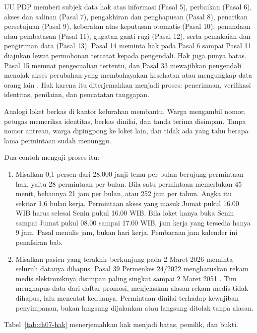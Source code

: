 UU PDP memberi subjek data hak atas informasi (Pasal 5), perbaikan (Pasal 6), akses dan salinan
(Pasal 7), pengakhiran dan penghapusan (Pasal 8), penarikan persetujuan (Pasal 9), keberatan atas
keputusan otomatis (Pasal 10), penundaan atau pembatasan (Pasal 11), gugatan ganti rugi (Pasal 12),
serta pemakaian dan pengiriman data (Pasal 13). Pasal 14 meminta hak pada Pasal 6 sampai Pasal 11
diajukan lewat permohonan tercatat kepada pengendali. Hak juga punya batas. Pasal 15 memuat
pengecualian tertentu, dan Pasal 33 mewajibkan pengendali menolak akses perubahan yang membahayakan
kesehatan atau mengungkap data orang lain \cite{uu27-2022-pdp}. Hak karena itu diterjemahkan menjadi
proses: penerimaan, verifikasi identitas, penilaian, dan pencatatan tanggapan.

Analogi loket berkas di kantor kelurahan membantu. Warga mengambil nomor, petugas memeriksa
identitas, berkas dinilai, dan tanda terima disimpan. Tanpa nomor antrean, warga dipingpong ke loket
lain, dan tidak ada yang tahu berapa lama permintaan sudah menunggu.

Dua contoh menguji proses itu:
\begin{enumerate}
  \item Misalkan 0,1 persen dari 28.000 janji temu per bulan berujung permintaan hak, yaitu 28
  permintaan per bulan. Bila satu permintaan memerlukan 45 menit, bebannya 21 jam per bulan, atau
  252 jam per tahun. Angka itu sekitar 1,6 bulan kerja. Permintaan akses yang masuk Jumat pukul
  16.00 WIB harus selesai Senin pukul 16.00 WIB. Bila loket hanya buka Senin sampai Jumat pukul
  08.00 sampai 17.00 WIB, jam kerja yang tersedia hanya 9 jam. Pasal menulis jam, bukan hari kerja.
  Pembacaan jam kalender ini penafsiran bab.
  \item Misalkan pasien yang terakhir berkunjung pada 2 Maret 2026 meminta seluruh datanya dihapus.
  Pasal 39 Permenkes 24/2022 mengharuskan rekam medis elektroniknya disimpan paling singkat sampai 2
  Maret 2051 \cite{permenkes24-2022}. Tim menghapus data dari daftar promosi, menjelaskan alasan
  rekam medis tidak dihapus, lalu mencatat keduanya. Permintaan dinilai terhadap kewajiban
  penyimpanan, bukan langsung dijalankan atau langsung ditolak tanpa alasan.
\end{enumerate}

Tabel~\ref{tab:ch07-hak} menerjemahkan hak menjadi batas, pemilik, dan bukti.

